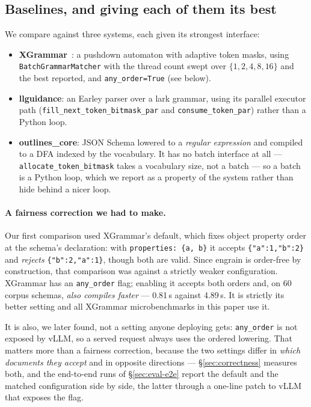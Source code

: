 \documentclass{article}
\begin{document}
\subsection{Baselines, and giving each of them its best}
\label{sec:baselines}

We compare against three systems, each given its strongest interface:

\begin{itemize}
\item \textbf{XGrammar}~\cite{dong2024xgrammar}: a pushdown automaton with
adaptive token masks, using \texttt{BatchGrammarMatcher} with the thread count
swept over $\{1,2,4,8,16\}$ and the best reported, and \texttt{any\_order=True}
(see below).
\item \textbf{llguidance}: an Earley parser over a lark grammar, using its
parallel executor path (\texttt{fill\_next\_token\_bit\-mask\_par} and
\texttt{consume\_token\_par}) rather than a Python loop.
\item \textbf{outlines\_core}: JSON Schema lowered to a \emph{regular
expression} and compiled to a DFA indexed by the vocabulary. It has no batch
interface at all --- \texttt{allocate\_token\_bitmask} takes a vocabulary size,
not a batch --- so a batch is a Python loop, which we report as a property of
the system rather than hide behind a nicer loop.
\end{itemize}

\paragraph{A fairness correction we had to make.} Our first comparison used
XGrammar's default, which fixes object property order at the schema's
declaration: with \texttt{properties: \{a, b\}} it accepts
\texttt{\{"a":1,"b":2\}} and \emph{rejects} \texttt{\{"b":2,"a":1\}}, though
both are valid. Since engrain is order-free by construction, that comparison
was against a strictly weaker configuration. XGrammar has an
\texttt{any\_order} flag; enabling it accepts both orders and, on 60 corpus
schemas, \emph{also compiles faster} --- 0.81\,s against 4.89\,s. It is
strictly its better setting and all XGrammar microbenchmarks in this paper use
it.

It is also, we later found, not a setting anyone deploying gets:
\texttt{any\_order} is not exposed by vLLM, so a served request always uses the
ordered lowering. That matters more than a fairness correction, because the two
settings differ in \emph{which documents they accept} and in opposite
directions --- \S\ref{sec:correctness} measures both, and the end-to-end runs
of \S\ref{sec:eval-e2e} report the default and the matched configuration side
by side, the latter through a one-line patch to vLLM that exposes the flag.
\end{document}
